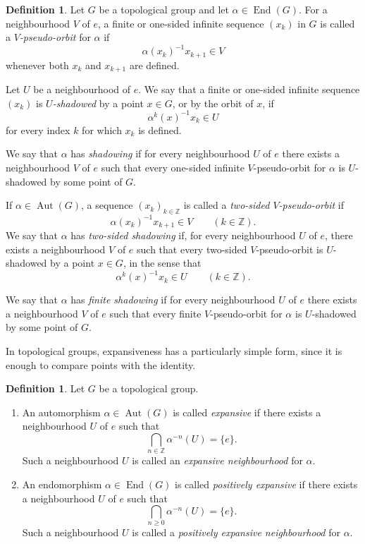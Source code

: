 \documentclass[12pt]{amsart}
\theoremstyle{definition}
\newtheorem{definition}[theorem]{Definition}
\numberwithin{equation}{section}
\theoremstyle{remark}
\begin{document}
\begin{definition}
Let $G$ be a topological group and let $\alpha\in\operatorname{End}(G)$.
For a neighbourhood $V$ of $e$, a finite or one-sided infinite sequence
$(x_k)$ in $G$ is called a \emph{$V$-pseudo-orbit} for $\alpha$ if
\[
\alpha(x_k)^{-1}x_{k+1}\in V
\]
whenever both $x_k$ and $x_{k+1}$ are defined.

Let $U$ be a neighbourhood of $e$. We say that a finite or one-sided
infinite sequence $(x_k)$ is \emph{$U$-shadowed} by a point $x\in G$, or by
the orbit of $x$, if
\[
\alpha^k(x)^{-1}x_k\in U
\]
for every index $k$ for which $x_k$ is defined.

We say that $\alpha$ has \emph{shadowing} if for every neighbourhood $U$ of
$e$ there exists a neighbourhood $V$ of $e$ such that every one-sided
infinite $V$-pseudo-orbit for $\alpha$ is $U$-shadowed by some point of
$G$.

If $\alpha\in\operatorname{Aut}(G)$, a sequence $(x_k)_{k\in\mathbb Z}$ is
called a \emph{two-sided $V$-pseudo-orbit} if
\[
\alpha(x_k)^{-1}x_{k+1}\in V
\qquad (k\in\mathbb Z).
\]
We say that $\alpha$ has \emph{two-sided shadowing} if, for every
neighbourhood $U$ of
$e$, there exists a neighbourhood $V$ of $e$ such that every two-sided
$V$-pseudo-orbit is $U$-shadowed by a point $x\in G$, in the sense that
\[
\alpha^k(x)^{-1}x_k\in U
\qquad (k\in\mathbb Z).
\]

We say that $\alpha$ has \emph{finite shadowing} if for every neighbourhood
$U$ of $e$ there exists a neighbourhood $V$ of $e$ such that every finite
$V$-pseudo-orbit for $\alpha$ is $U$-shadowed by some point of $G$.
\end{definition}

In topological groups, expansiveness has a particularly simple form, since
it is enough to compare points with the identity.

\begin{definition}
Let $G$ be a topological group.
\begin{enumerate}
\item An automorphism $\alpha\in\operatorname{Aut}(G)$ is called
\emph{expansive} if there exists a neighbourhood $U$ of $e$ such that
\[
\bigcap_{n\in\mathbb Z}\alpha^{-n}(U)=\{e\}.
\]
Such a neighbourhood $U$ is called an \emph{expansive neighbourhood} for
$\alpha$.

\item An endomorphism $\alpha\in\operatorname{End}(G)$ is called
\emph{positively expansive} if there exists a neighbourhood $U$ of $e$ such
that
\[
\bigcap_{n\geq 0}\alpha^{-n}(U)=\{e\}.
\]
Such a neighbourhood $U$ is called a \emph{positively expansive
neighbourhood} for $\alpha$.
\end{enumerate}
\end{definition}
\end{document}
